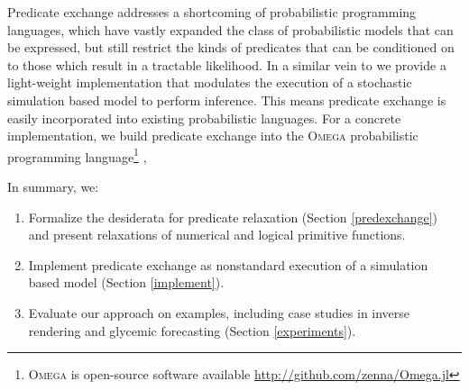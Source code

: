 


Predicate exchange addresses a shortcoming of probabilistic programming languages,
which have vastly expanded the class of probabilistic models that can be expressed, but still restrict the kinds of predicates that can be conditioned on to those which result in a tractable likelihood.
In a similar vein to  \cite{wingate2011lightweight} we provide a light-weight implementation that modulates the execution of a stochastic simulation based model to perform inference.
This means predicate exchange is easily incorporated into existing probabilistic languages.
For a concrete implementation, we build predicate exchange into the \textsc{Omega} probabilistic programming language\footnote{\textsc{Omega} is open-source software available \url{http://github.com/zenna/Omega.jl}} \cite{rcd},


In summary, we:

\begin{enumerate}
	\item Formalize the desiderata for predicate relaxation (Section \ref{predexchange}) and present relaxations of numerical and logical primitive functions.
	\item Implement predicate exchange as nonstandard execution of a simulation based model (Section \ref{implement}).
	\item Evaluate our approach on examples, including case studies in inverse rendering and glycemic forecasting (Section \ref{experiments}).
\end{enumerate}


